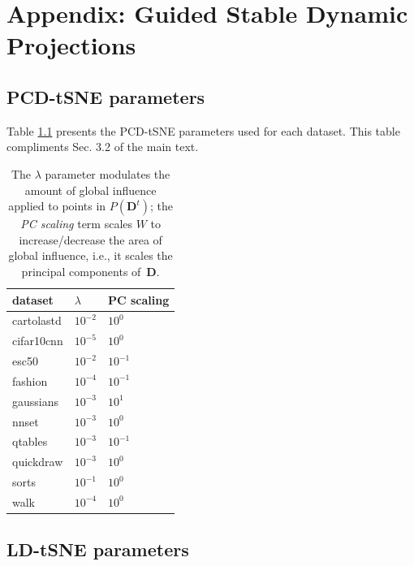 
\chapter{Appendix: Guided Stable Dynamic Projections}

\section{PCD-tSNE parameters}

Table \ref{tab:pcd-params} presents the PCD-tSNE parameters used for each dataset. This table compliments Sec. 3.2 of the main text. 

\begin{table}[h!]
  \centering
  \selectfont
  \scriptsize
  \begin{tabular}{|l|l|l|}
  \hline
  {dataset}    & {$\lambda$} & {PC scaling}        \\ \hline
  \hline
  cartolastd & $10^{-2}$ & $10^{0}$  \\ \hline
  cifar10cnn & $10^{-5}$ & $10^{0}$  \\ \hline
  esc50      & $10^{-2}$ & $10^{-1}$ \\ \hline
  fashion    & $10^{-4}$ & $10^{-1}$ \\ \hline
  gaussians  & $10^{-3}$ & $10^{1}$  \\ \hline
  nnset      & $10^{-3}$ & $10^{0}$  \\ \hline
  qtables    & $10^{-3}$ & $10^{-1}$ \\ \hline
  quickdraw  & $10^{-3}$ & $10^{0}$  \\ \hline
  sorts      & $10^{-1}$ & $10^{0}$  \\ \hline
  walk       & $10^{-4}$ & $10^{0}$  \\ \hline
  \end{tabular}
  \caption{The $\lambda$ parameter modulates the amount of global influence applied to points in $P(\mathbf{D}^t)$; the \emph{PC scaling} term scales $W$ to increase/decrease the area of global influence, i.e., it scales the principal components of \,$\mathbf{D}$.}
  \label{tab:pcd-params}
\end{table}

\section{LD-tSNE parameters}

